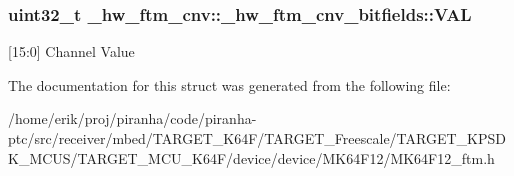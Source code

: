 \subsubsection[{\texorpdfstring{V\+AL}{VAL}}]{\setlength{\rightskip}{0pt plus 5cm}uint32\+\_\+t \+\_\+hw\+\_\+ftm\+\_\+cnv\+::\+\_\+hw\+\_\+ftm\+\_\+cnv\+\_\+bitfields\+::\+V\+AL}\hypertarget{struct__hw__ftm__cnv_1_1__hw__ftm__cnv__bitfields_a3c15b14896e9caafbd972394f2c93666}{}\label{struct__hw__ftm__cnv_1_1__hw__ftm__cnv__bitfields_a3c15b14896e9caafbd972394f2c93666}
\mbox{[}15\+:0\mbox{]} Channel Value 

The documentation for this struct was generated from the following file\+:\begin{DoxyCompactItemize}
\item 
/home/erik/proj/piranha/code/piranha-\/ptc/src/receiver/mbed/\+T\+A\+R\+G\+E\+T\+\_\+\+K64\+F/\+T\+A\+R\+G\+E\+T\+\_\+\+Freescale/\+T\+A\+R\+G\+E\+T\+\_\+\+K\+P\+S\+D\+K\+\_\+\+M\+C\+U\+S/\+T\+A\+R\+G\+E\+T\+\_\+\+M\+C\+U\+\_\+\+K64\+F/device/device/\+M\+K64\+F12/M\+K64\+F12\+\_\+ftm.\+h\end{DoxyCompactItemize}
